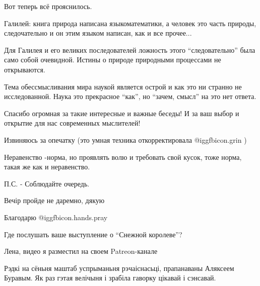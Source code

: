 \begin{multicols}{2}

Вот теперь всё прояснилось.


Галилей:  книга природа написана языкоматематики, а человек  это часть природы,
следочательно и он этим языком написан, как и все прочее...

\begin{itemize} %

Для Галилея и его великих последователей ложность этого \enquote{следовательно} была
само собой очевидной. Истины о природе природными процессами не открываются.

\end{itemize} %


Тема обессмысливания мира наукой является острой и как это ни странно не
исследованной. Наука это прекрасное \enquote{как}, но \enquote{зачем, смысл} на
это нет ответа.


Спасибо огромная за такие интересные и важные беседы! И за ваш выбор и открытие
для нас современных мыслителей!

\begin{itemize} %
Извиняюсь за опечатку (это умная техника откорректировала @igg{fbicon.grin} )
\end{itemize} %


Неравенство -норма, но проявлять волю и требовать свой кусок, тоже норма, такая же как и неравенство.

П.С. - Соблюдайте очередь.

Вечір пройде не даремно, дякую

Благодарю  @igg{fbicon.hands.pray} 

Где послушать ваше выступление о \enquote{Снежной королеве}?


Лена, видео я разместил на своем Patreon-канале


Рэдкі на сёньня маштаб успрыманьня рэчаіснасьці, прапанаваны Аляксеем Буравым.
Як раз гэтая велічыня і зрабіла гаворку цікавай і сэнсавай.



\end{multicols}
